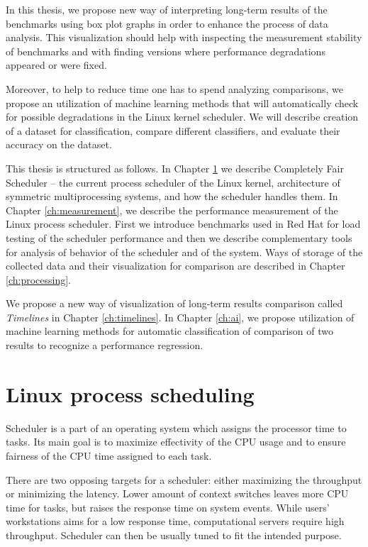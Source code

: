 In this thesis, we propose new way of interpreting long-term results of the
benchmarks using box plot graphs in order to enhance the process of data
analysis. This visualization should help with inspecting the measurement
stability of benchmarks and with finding versions where performance degradations
appeared or were fixed.

Moreover, to help to reduce time one has to spend analyzing comparisons,
we propose an utilization of machine learning methods that will
automatically check for possible degradations in the Linux kernel scheduler. We will
describe creation of a dataset for classification, compare different
classifiers, and evaluate their accuracy on the dataset.

This thesis is structured as follows. In Chapter \ref{ch:scheduler} we describe
Completely Fair Scheduler -- the current process scheduler of the Linux kernel,
architecture of symmetric multiprocessing systems, and how the scheduler handles
them. In Chapter \ref{ch:measurement}, we describe the performance measurement of
the Linux process scheduler. First we introduce benchmarks used in Red Hat for
load testing of the scheduler performance and then we describe complementary tools for analysis of
behavior of the scheduler and of the system. Ways of storage of the collected data
and their visualization for comparison are described in Chapter
\ref{ch:processing}.

We propose a new way of visualization of long-term results comparison called
\emph{Timelines} in Chapter \ref{ch:timelines}. In Chapter
\ref{ch:ai}, we propose utilization of machine learning methods for automatic
classification of comparison of two results to recognize a performance
regression.



\chapter{Linux process scheduling} \label{ch:scheduler}
Scheduler is a part of an operating system which assigns the processor time to tasks.
Its main goal is to maximize effectivity of the CPU usage and to ensure fairness of the
CPU time assigned to each task.

There are two opposing targets for a scheduler: either maximizing the throughput or
minimizing the latency. Lower amount of context switches leaves more CPU time for
tasks, but raises the response time on system events.
While users' workstations aims for a low response time, computational servers
require high throughput. Scheduler can then be usually tuned to fit the intended
purpose.

